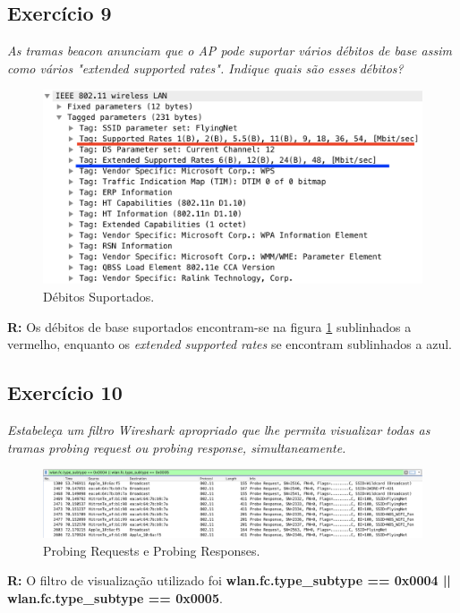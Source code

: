 \documentclass{llncs}
\begin{document}
\subsection{Exercício 9}
\emph{As tramas beacon anunciam que o AP pode suportar vários débitos de base assim como vários "extended supported rates". Indique quais são esses débitos?}
\begin{figure}[H]
\begin{center}
\includegraphics[scale=0.30]{9.png} 
\end{center}
\caption{\label{fig:9}Débitos Suportados.}
\end{figure} 
\par
\textbf{R:} Os débitos de base suportados encontram-se na figura \ref{fig:9} sublinhados a vermelho, enquanto os \emph{extended supported rates} se encontram sublinhados a azul.


\subsection{Exercício 10}
\emph{Estabeleça um filtro Wireshark apropriado que lhe permita visualizar todas as tramas probing request ou probing response, simultaneamente.}
\begin{figure}[H]
\begin{center}
\includegraphics[scale=0.30]{10.png} 
\end{center}
\caption{\label{fig:10}Probing Requests e Probing Responses.}
\end{figure} 
\par
\textbf{R:} O filtro de visualização utilizado foi \textbf{wlan.fc.type\_subtype == 0x0004 || wlan.fc.type\_subtype == 0x0005}.
\end{document}
